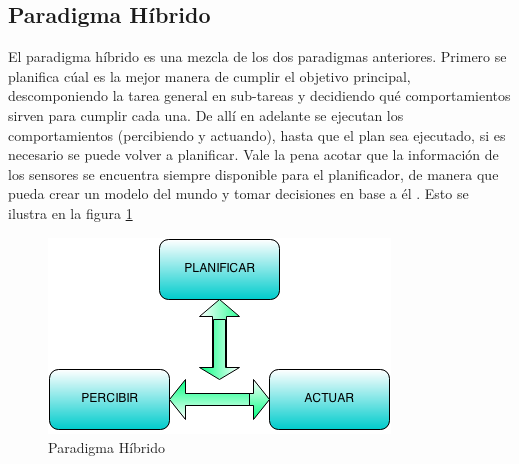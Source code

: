 \subsection{Paradigma Híbrido}
El paradigma híbrido es una mezcla de los dos paradigmas anteriores. Primero se planifica cúal es la mejor manera de cumplir el objetivo principal, descomponiendo la tarea general en sub-tareas y decidiendo qué comportamientos sirven para cumplir cada una. De allí en adelante se ejecutan los comportamientos (percibiendo y actuando), hasta que el plan sea ejecutado, si es necesario se puede volver a planificar. Vale la pena acotar que la información de los sensores se encuentra siempre disponible para el planificador, de manera que pueda crear un modelo del mundo y tomar decisiones en base a él  \cite{AiRobotics}. Esto se ilustra en la figura \ref{fig:hibrido}
\begin{figure}[hbtp]

\centering
\includegraphics[scale=0.4]{imagenes/hibrido.png} 
\caption{Paradigma H\'ibrido}
\label{fig:hibrido}
\end{figure}
